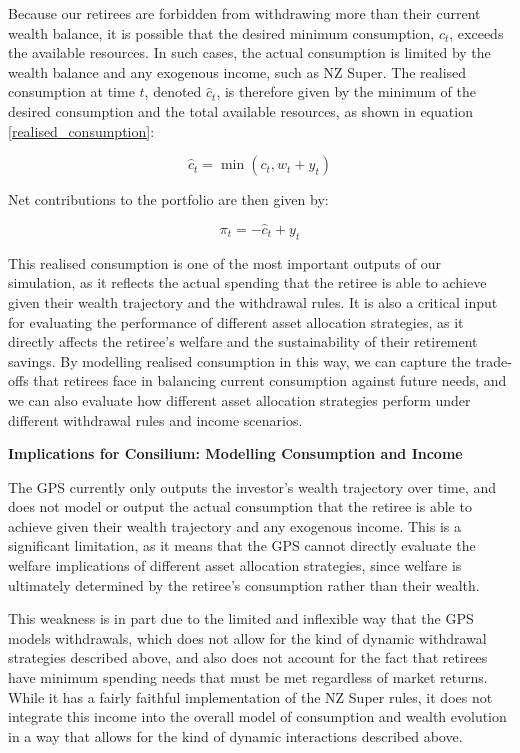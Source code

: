 \documentclass[11pt]{article}
\newcommand{\asideboxtitle}[1]{\noindent\textbf{\large #1}\par\vspace{0.5em}}
\begin{document}
Because our retirees are forbidden from withdrawing more than their current wealth balance, it is possible that the desired minimum consumption, \(c_t\), exceeds the available resources. In such cases, the actual consumption is limited by the wealth balance and any exogenous income, such as NZ Super. The realised consumption at time \(t\), denoted \(\hat{c}_t\), is therefore given by the minimum of the desired consumption and the total available resources, as shown in equation \ref{realised_consumption}:

\begin{equation}\label{realised_consumption}
\hat{c}_t = \min\left(c_t, w_t + y_t\right)
\end{equation}

Net contributions to the portfolio are then given by:

\begin{equation}\label{net_inflows_pi}
  \pi_t = -\hat{c}_t + y_t
\end{equation}

This realised consumption is one of the most important outputs of our simulation, as it reflects the actual spending that the retiree is able to achieve given their wealth trajectory and the withdrawal rules. It is also a critical input for evaluating the performance of different asset allocation strategies, as it directly affects the retiree's welfare and the sustainability of their retirement savings. By modelling realised consumption in this way, we can capture the trade-offs that retirees face in balancing current consumption against future needs, and we can also evaluate how different asset allocation strategies perform under different withdrawal rules and income scenarios.

\begin{asidebox}
  \asideboxtitle{Implications for Consilium: Modelling Consumption and Income}

  The GPS currently only outputs the investor's wealth trajectory over time, and does not model or output the actual consumption that the retiree is able to achieve given their wealth trajectory and any exogenous income. This is a significant limitation, as it means that the GPS cannot directly evaluate the welfare implications of different asset allocation strategies, since welfare is ultimately determined by the retiree's consumption rather than their wealth. 

  This weakness is in part due to the limited and inflexible way that the GPS models withdrawals, which does not allow for the kind of dynamic withdrawal strategies described above, and also does not account for the fact that retirees have minimum spending needs that must be met regardless of market returns. While it has a fairly faithful implementation of the NZ Super rules, it does not integrate this income into the overall model of consumption and wealth evolution in a way that allows for the kind of dynamic interactions described above.
\end{asidebox}
\end{document}
